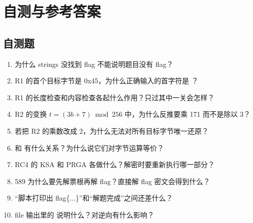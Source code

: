 \documentclass[UTF8,12pt,oneside]{ctexbook}
\begin{document}

\chapter{自测与参考答案}

\section{自测题}
\begin{enumerate}
\item 为什么 strings 没找到 flag 不能说明题目没有 flag？
\item R1 的首个目标字节是 0x45，为什么正确输入的首字符是 ？
\item R1 的长度检查和内容检查各起什么作用？只过其中一关会怎样？
\item R2 的变换 $t=(3b+7)\bmod256$ 中，为什么反推要乘 171 而不是除以 3？
\item 若把 R2 的乘数改成 2，为什么无法对所有目标字节唯一还原？
\item {} 和  有什么关系？为什么说它们对字节运算等价？
\item RC4 的 KSA 和 PRGA 各做什么？解密时要重新执行哪一部分？
\item 589 为什么要先解票根再解 flag？直接解 flag 密文会得到什么？
\item “脚本打印出 flag\{...\}”和“解题完成”之间还差什么？
\item file 输出里的  说明什么？对逆向有什么影响？
\end{enumerate}
\end{document}
